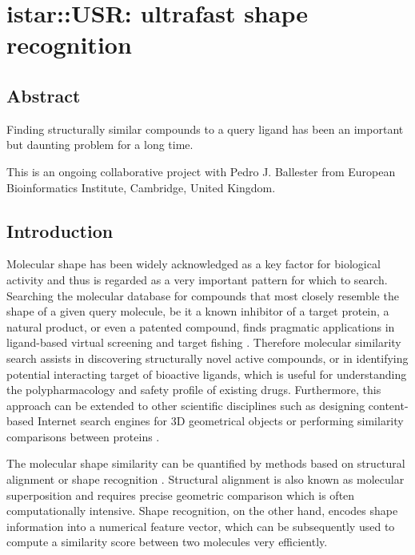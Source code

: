 \chapter{istar::USR: ultrafast shape recognition}

\section{Abstract}

Finding structurally similar compounds to a query ligand has been an important but daunting problem for a long time.

This is an ongoing collaborative project with Pedro J. Ballester from European Bioinformatics Institute, Cambridge, United Kingdom.

\section{Introduction}

Molecular shape has been widely acknowledged as a key factor for biological activity and thus is regarded as a very important pattern for which to search. Searching the molecular database for compounds that most closely resemble the shape of a given query molecule, be it a known inhibitor of a target protein, a natural product, or even a patented compound, finds pragmatic applications in ligand-based virtual screening \citep{1332,1380} and target fishing \citep{1408,1402}. Therefore molecular similarity search assists in discovering structurally novel active compounds, or in identifying potential interacting target of bioactive ligands, which is useful for understanding the polypharmacology and safety profile of existing drugs. Furthermore, this approach can be extended to other scientific disciplines such as designing content-based Internet search engines for 3D geometrical objects or performing similarity comparisons between proteins \citep{1280}.

The molecular shape similarity can be quantified by methods based on structural alignment \citep{1440,887,1439} or shape recognition \citep{1379,1338,1331}. Structural alignment is also known as molecular superposition and requires precise geometric comparison which is often computationally intensive. Shape recognition, on the other hand, encodes shape information into a numerical feature vector, which can be subsequently used to compute a similarity score between two molecules very efficiently.%

